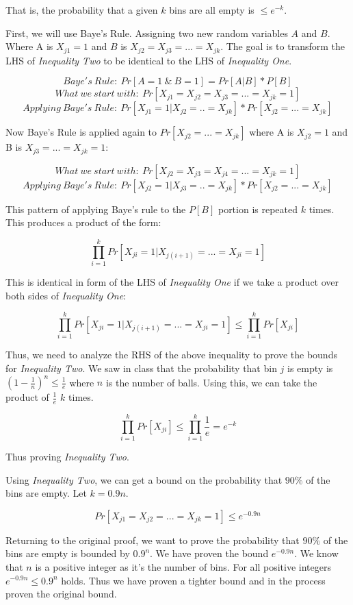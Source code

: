 \documentclass[11pt]{article}
\begin{document}
That is, the probability that a given $k$ bins are all empty is $\leq e^{-k}$.

First, we will use Baye's Rule. Assigning two new random variables $A$ and $B$. Where A is $X_{j1} = 1$ and $B$ is $X_{j2} = X_{j3} = ... = X_{jk}$. The goal is to transform the LHS of \textit{Inequality Two} to be identical to the LHS of \textit{Inequality One}.

$$Baye's \ Rule: \ Pr[A = 1 \ \& \ B = 1] = Pr[A|B] * P[B]$$
$$What \ we \ start \ with: \ Pr[X_{j1} = X_{j2} = X_{j3} = ... = X_{jk} = 1]$$
$$Applying \ Baye's \ Rule: \ Pr[X_{j1} = 1 | X_{j2} = .. = X_{jk}] * Pr[X_{j2} = ... = X_{jk}]$$

Now Baye's Rule is applied again to $Pr[X_{j2} = ... = X_{jk}]$ where A is $X_{j2} = 1$ and B is $X_{j3} = ... = X_{jk} = 1$:

$$What \ we \ start \ with: \ Pr[X_{j2} = X_{j3} = X_{j4} = ... = X_{jk} = 1]$$
$$Applying \ Baye's \ Rule: \ Pr[X_{j2} = 1 | X_{j3} = .. = X_{jk}] * Pr[X_{j2} = ... = X_{jk}]$$

This pattern of applying Baye's rule to the $P[B]$ portion is repeated $k$ times. This produces a product of the form:

$$\prod_{i = 1}^k Pr[X_{ji} = 1 | X_{j(i + 1)} = ... = X_{ji} = 1]$$

This is identical in form of the LHS of \textit{Inequality One} if we take a product over both sides of \textit{Inequality One}:

$$\prod_{i = 1}^k Pr[X_{ji} = 1 | X_{j(i + 1)} = ... = X_{ji} = 1] \leq \prod_{i = 1}^k Pr[X_{ji}]$$

Thus, we need to analyze the RHS of the above inequality to prove the bounds for \textit{Inequality Two}. We saw in class that the probability that bin $j$ is empty is $(1 - \frac{1}{n})^n \leq \frac{1}{e}$ where $n$ is the number of balls. Using this, we can take the product of $\frac{1}{e}$ $k$ times.

$$\prod_{i = 1}^k Pr[X_{ji}] \leq \prod_{i = 1}^k \frac{1}{e} = e^{-k}$$

Thus proving \textit{Inequality Two}.

Using \textit{Inequality Two}, we can get a bound on the probability that $90\%$ of the bins are empty. Let $k = 0.9n$.

$$Pr[X_{j1} = X_{j2} = ... = X_{jk} = 1] \leq e^{-0.9n}$$

Returning to the original proof, we want to prove the probability that $90\%$ of the bins are empty is bounded by $0.9^n$. We have proven the bound $e^{-0.9n}$. We know that $n$ is a positive integer as it's the number of bins. For all positive integers $e^{-0.9n } \leq 0.9^n$ holds. Thus we have proven a tighter bound and in the process proven the original bound.
\end{document}
